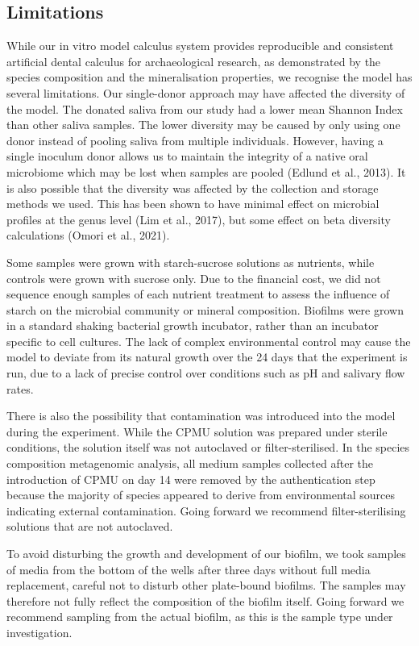 \documentclass[
]{article}
\begin{document}
\hypertarget{limitations}{%
\subsection{Limitations}\label{limitations}}

While our in vitro model calculus system provides reproducible and
consistent artificial dental calculus for archaeological research, as
demonstrated by the species composition and the mineralisation
properties, we recognise the model has several limitations. Our
single-donor approach may have affected the diversity of the model. The
donated saliva from our study had a lower mean Shannon Index than other
saliva samples. The lower diversity may be caused by only using one
donor instead of pooling saliva from multiple individuals. However,
having a single inoculum donor allows us to maintain the integrity of a
native oral microbiome which may be lost when samples are pooled (Edlund
et al., 2013). It is also possible that the diversity was affected by
the collection and storage methods we used. This has been shown to have
minimal effect on microbial profiles at the genus level (Lim et al.,
2017), but some effect on beta diversity calculations (Omori et al.,
2021).

Some samples were grown with starch-sucrose solutions as nutrients,
while controls were grown with sucrose only. Due to the financial cost,
we did not sequence enough samples of each nutrient treatment to assess
the influence of starch on the microbial community or mineral
composition. Biofilms were grown in a standard shaking bacterial growth
incubator, rather than an incubator specific to cell cultures. The lack
of complex environmental control may cause the model to deviate from its
natural growth over the 24 days that the experiment is run, due to a
lack of precise control over conditions such as pH and salivary flow
rates.

There is also the possibility that contamination was introduced into the
model during the experiment. While the CPMU solution was prepared under
sterile conditions, the solution itself was not autoclaved or
filter-sterilised. In the species composition metagenomic analysis, all
medium samples collected after the introduction of CPMU on day 14 were
removed by the authentication step because the majority of species
appeared to derive from environmental sources indicating external
contamination. Going forward we recommend filter-sterilising solutions
that are not autoclaved.

To avoid disturbing the growth and development of our biofilm, we took
samples of media from the bottom of the wells after three days without
full media replacement, careful not to disturb other plate-bound
biofilms. The samples may therefore not fully reflect the composition of
the biofilm itself. Going forward we recommend sampling from the actual
biofilm, as this is the sample type under investigation.
\end{document}
